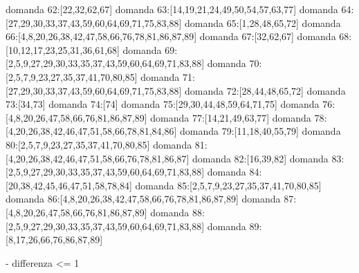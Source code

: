 domanda 62:[22,32,62,67]
domanda 63:[14,19,21,24,49,50,54,57,63,77]
domanda 64:[27,29,30,33,37,43,59,60,64,69,71,75,83,88]
domanda 65:[1,28,48,65,72]
domanda 66:[4,8,20,26,38,42,47,58,66,76,78,81,86,87,89]
domanda 67:[32,62,67]
domanda 68:[10,12,17,23,25,31,36,61,68]
domanda 69:[2,5,9,27,29,30,33,35,37,43,59,60,64,69,71,83,88]
domanda 70:[2,5,7,9,23,27,35,37,41,70,80,85]
domanda 71:[27,29,30,33,37,43,59,60,64,69,71,75,83,88]
domanda 72:[28,44,48,65,72]
domanda 73:[34,73]
domanda 74:[74]
domanda 75:[29,30,44,48,59,64,71,75]
domanda 76:[4,8,20,26,47,58,66,76,81,86,87,89]
domanda 77:[14,21,49,63,77]
domanda 78:[4,20,26,38,42,46,47,51,58,66,78,81,84,86]
domanda 79:[11,18,40,55,79]
domanda 80:[2,5,7,9,23,27,35,37,41,70,80,85]
domanda 81:[4,20,26,38,42,46,47,51,58,66,76,78,81,86,87]
domanda 82:[16,39,82]
domanda 83:[2,5,9,27,29,30,33,35,37,43,59,60,64,69,71,83,88]
domanda 84:[20,38,42,45,46,47,51,58,78,84]
domanda 85:[2,5,7,9,23,27,35,37,41,70,80,85]
domanda 86:[4,8,20,26,38,42,47,58,66,76,78,81,86,87,89]
domanda 87:[4,8,20,26,47,58,66,76,81,86,87,89]
domanda 88:[2,5,9,27,29,30,33,35,37,43,59,60,64,69,71,83,88]
domanda 89:[8,17,26,66,76,86,87,89]


- differenza <= 1


